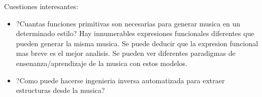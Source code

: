 \documentclass{article}
\begin{document}
Cuestiones interesantes: 
\begin{itemize}
\item ?Cuantas funciones primitivas son necesarias para generar musica en un determinado estilo? Hay innumerables expresiones funcionales diferentes que pueden generar la misma musica. Se puede deducir que la expresion funcional mas breve es el mejor analisis. Se pueden ver diferentes paradigmas de ensenanza/aprendizaje de la musica con estos modelos.
\item ?Como puede hacerse ingenieria inversa automatizada para extraer estructuras desde la musica?
\end{itemize}

%
%
%
%
%
%
\end{document}
